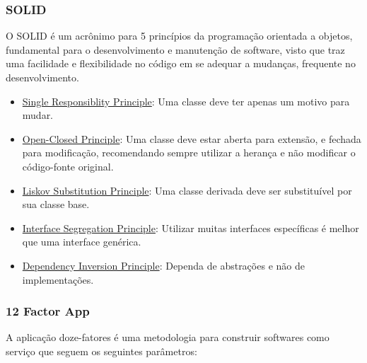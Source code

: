\subsubsection{SOLID}

O SOLID é um acrônimo para 5 princípios da programação orientada a objetos, fundamental para o desenvolvimento e manutenção de software, visto que traz uma facilidade e flexibilidade no código em se adequar a mudanças, frequente no desenvolvimento.

\begin{itemize}
    \item \underline{Single Responsiblity Principle}: Uma classe deve ter apenas um motivo para mudar.
    \item \underline{Open-Closed Principle}: Uma classe deve estar aberta para extensão, e fechada para modificação, recomendando sempre utilizar a herança e não modificar o código-fonte original.
    \item \underline{Liskov Substitution Principle}: Uma classe derivada deve ser substituível por sua classe base.
    \item \underline{Interface Segregation Principle}: Utilizar muitas interfaces específicas é melhor que uma interface genérica.
    \item \underline{Dependency Inversion Principle}: Dependa de abstrações e não de implementações.
\end{itemize}

\subsubsection{12 Factor App}

A aplicação doze-fatores é uma metodologia para construir softwares como serviço que seguem os seguintes parâmetros:

